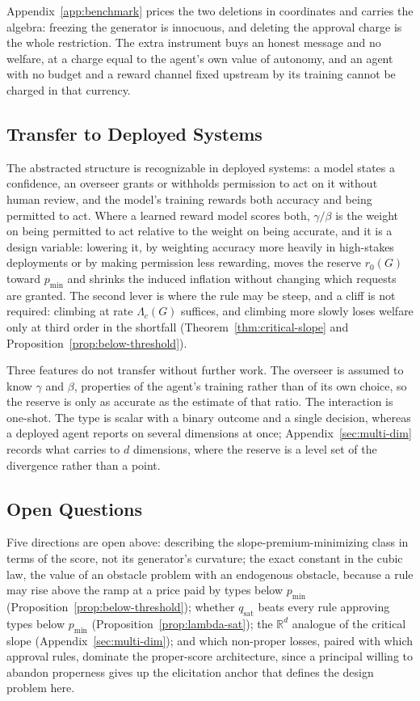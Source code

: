 \documentclass[acmsmall,nonacm,screen]{acmart}
\theoremstyle{acmplain}%
\theoremstyle{acmdefinition}%
\newcommand{\R}{\mathbb{R}}
\numberwithin{equation}{section}
\begin{document}
Appendix~\ref{app:benchmark} prices the two deletions in coordinates and carries the algebra: freezing the generator is innocuous, and deleting the approval charge is the whole restriction. The extra instrument buys an honest message and no welfare, at a charge equal to the agent's own value of autonomy, and an agent with no budget and a reward channel fixed upstream by its training cannot be charged in that currency.

\subsection{Transfer to Deployed Systems}

The abstracted structure is recognizable in deployed systems: a model states a confidence, an overseer grants or withholds permission to act on it without human review, and the model's training rewards both accuracy and being permitted to act. Where a learned reward model scores both, $\gamma/\beta$ is the weight on being permitted to act relative to the weight on being accurate, and it is a design variable: lowering it, by weighting accuracy more heavily in high-stakes deployments or by making permission less rewarding, moves the reserve $r_0(G)$ toward $p_{\min}$ and shrinks the induced inflation without changing which requests are granted. The second lever is where the rule may be steep, and a cliff is not required: climbing at rate $\Lambda_c(G)$ suffices, and climbing more slowly loses welfare only at third order in the shortfall (Theorem~\ref{thm:critical-slope} and Proposition~\ref{prop:below-threshold}).

Three features do not transfer without further work. The overseer is assumed to know $\gamma$ and $\beta$, properties of the agent's training rather than of its own choice, so the reserve is only as accurate as the estimate of that ratio. The interaction is one-shot. The type is scalar with a binary outcome and a single decision, whereas a deployed agent reports on several dimensions at once; Appendix~\ref{sec:multi-dim} records what carries to $d$ dimensions, where the reserve is a level set of the divergence rather than a point.

\subsection{Open Questions}

Five directions are open above: describing the slope-premium-minimizing class in terms of the score, not its generator's curvature; the exact constant in the cubic law, the value of an obstacle problem with an endogenous obstacle, because a rule may rise above the ramp at a price paid by types below $p_{\min}$ (Proposition~\ref{prop:below-threshold}); whether $q_{\mathrm{sat}}$ beats every rule approving types below $p_{\min}$ (Proposition~\ref{prop:lambda-sat}); the $\R^d$ analogue of the critical slope (Appendix~\ref{sec:multi-dim}); and which non-proper losses, paired with which approval rules, dominate the proper-score architecture, since a principal willing to abandon properness gives up the elicitation anchor that defines the design problem here.
\end{document}
